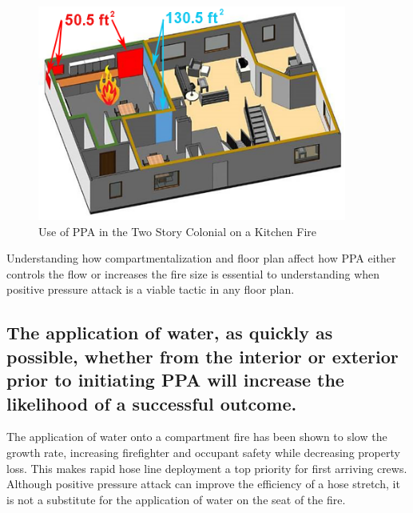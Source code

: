 \documentclass{article}
\begin{document}
\begin{figure}[H]
	\centering
	\includegraphics[width = 4in]{0_Images/Tactical_Considerations/Compartmentalization/Kitchen_Fire.png}
	\caption{Use of PPA in the Two Story Colonial on a Kitchen Fire}
	\label{fig:TwoStoryKitchenFire}
\end{figure}

Understanding how compartmentalization and floor plan affect how PPA either controls the flow or increases the fire size is essential to understanding when positive pressure attack is a viable tactic in any floor plan.

\subsection{The application of water, as quickly as possible, whether from the interior or exterior prior to initiating PPA will increase the likelihood of a successful outcome.} \label{sec:EarlyApplication}
The application of water onto a compartment fire has been shown to slow the growth rate, increasing firefighter and occupant safety while decreasing property loss. This makes rapid hose line deployment a top priority for first arriving crews. Although positive pressure attack can improve the efficiency of a hose stretch, it is not a substitute for the application of water on the seat of the fire.  
\end{document}

